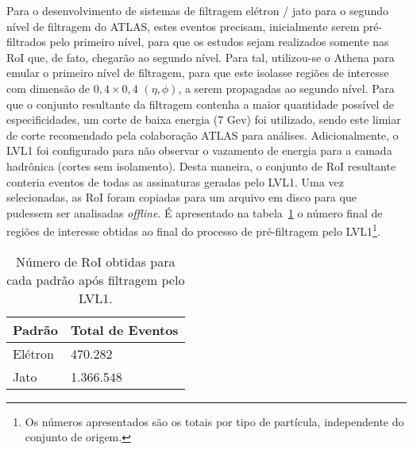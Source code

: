 Para o desenvolvimento de sistemas de filtragem elétron / jato para o segundo nível de filtragem do ATLAS, estes eventos precisam, inicialmente serem pré-filtrados pelo primeiro nível, para que os estudos sejam realizados somente nas RoI que, de fato, chegarão ao segundo nível. Para tal, utilizou-se o Athena para emular o primeiro nível de filtragem, para que este isolasse regiões de interesse com dimensão de $0,4 \times 0,4$ $(\eta , \phi)$,  a serem propagadas ao segundo nível. Para que o conjunto resultante da filtragem contenha a maior quantidade possível de especificidades, um corte de baixa energia (7 Gev) foi utilizado, sendo este limiar de corte recomendado pela colaboração ATLAS para análises. Adicionalmente, o LVL1 foi configurado para não observar o vazamento de energia para a camada hadrônica (cortes sem isolamento). Desta maneira, o conjunto de RoI resultante conteria eventos de todas as assinaturas geradas pelo LVL1. Uma vez selecionadas,  as RoI foram copiadas para um arquivo em disco para que pudessem ser analisadas \emph{offline}. É apresentado na tabela~\ref{tab:num_eventos_filtrados}  o número final de regiões de interesse obtidas ao final do processo de pré-filtragem pelo LVL1\footnote{Os números apresentados são os totais por tipo de partícula, independente do conjunto de origem.}.

\begin{table}
\caption{Número de RoI obtidas para cada padrão após filtragem pelo LVL1.}
\begin{center}
\begin{tabular}{|l|l|}
\hline
\textbf{Padrão} & \textbf{Total de Eventos} \\
\hline
Elétron & 470.282 \\
\hline
Jato &  1.366.548 \\
\hline
\end{tabular}
\end{center}
\label{tab:num_eventos_filtrados}
\end{table} 

